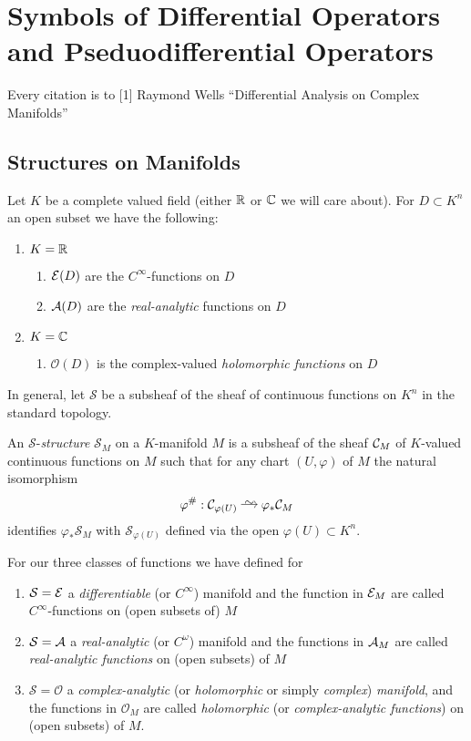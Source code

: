 \documentclass[12pt]{article}
\newcommand{\cO}{\mathcal{O}}
\begin{document}
 
\section{Symbols of Differential Operators and Pseduodifferential Operators}

\newcommand{\cS}{\mathcal{S}}
\newcommand{\inner}[2]{\left< #1, #2 \right>}
\newcommand{\OP}{\mathrm{OP}}
\renewcommand{\Diff}{\mathrm{Diff}}


Every citation is to [1] Raymond Wells ``Differential Analysis on Complex Manifolds''

\subsection{Structures on Manifolds}

Let $K$ be a complete valued field (either $\mathbb{R}$ or $\mathbb{C}$ we will care about). For $D \subset K^n$ an open subset we have the following:
\begin{enumerate}
\item $K = \mathbb{R}$
\begin{enumerate}
\item $\mathcal{E}(D)$ are the $C^\infty$-functions on $D$
\item $\mathcal{A}(D)$ are the \textit{real-analytic} functions on $D$
\end{enumerate}
\item $K = \mathbb{C}$
\begin{enumerate}
\item $\cO(D)$ is the complex-valued \textit{holomorphic functions} on $D$
\end{enumerate}
\end{enumerate}
In general, let $\cS$ be a subsheaf of the sheaf of continuous functions on $K^n$ in the standard topology.

\begin{defn} [1, Definition 1.1]
An $\cS$-\textit{structure} $\cS_M$ on a $K$-manifold $M$ is a subsheaf of the sheaf $\mathcal{C}_M$ of $K$-valued continuous functions on $M$ such that for any chart $(U, \varphi)$ of $M$ the natural isomorphism
\[ \varphi^{\#} : \cC_{\varphi(U)} \iso \varphi_* \cC_M \]
identifies $\varphi_* \cS_M$ with $\cS_{\varphi(U)}$ defined via the open $\varphi(U) \subset K^n$.  
\end{defn}

For our three classes of functions we have defined for
\begin{enumerate}
\item $\cS = \E$ a \textit{differentiable} (or $C^\infty$) manifold and the function in $\mathcal{E}_M$ are called $C^{\infty}$-functions on (open subsets of) $M$
\item $\cS = \cA$ a \textit{real-analytic} (or $C^\omega$) manifold and the functions in $\mathcal{A}_M$ are called \textit{real-analytic functions} on (open subsets) of $M$
\item $\cS = \cO$ a \textit{complex-analytic} (or \textit{holomorphic} or simply \textit{complex}) \textit{manifold}, and the functions in $\cO_M$ are called \textit{holomorphic} (or \textit{complex-analytic functions}) on (open subsets) of $M$.
\end{enumerate}
\end{document}

